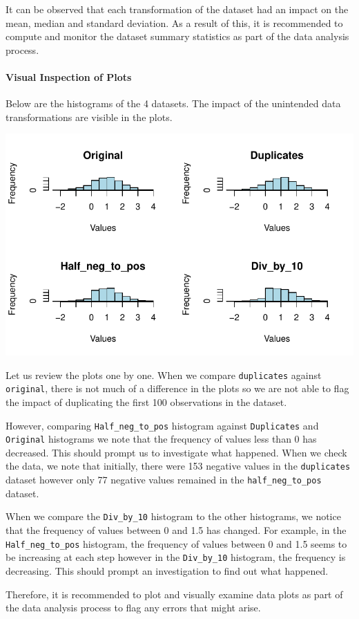 \documentclass[
  letterpaper,
  DIV=11,
  numbers=noendperiod]{scrartcl}
\let\oldparagraph\paragraph
\renewcommand{\paragraph}[1]{\oldparagraph{#1}\mbox{}}
\begin{document}
It can be observed that each transformation of the dataset had an impact
on the mean, median and standard deviation. As a result of this, it is
recommended to compute and monitor the dataset summary statistics as
part of the data analysis process.

\hypertarget{visual-inspection-of-plots}{%
\paragraph{Visual Inspection of
Plots}\label{visual-inspection-of-plots}}

Below are the histograms of the 4 datasets. The impact of the unintended
data transformations are visible in the plots.

\includegraphics{report_files/figure-pdf/unnamed-chunk-6-1.pdf}

Let us review the plots one by one. When we compare \texttt{duplicates}
against \texttt{original}, there is not much of a difference in the
plots so we are not able to flag the impact of duplicating the first 100
observations in the dataset.

However, comparing \texttt{Half\_neg\_to\_pos} histogram against
\texttt{Duplicates} and \texttt{Original} histograms we note that the
frequency of values less than 0 has decreased. This should prompt us to
investigate what happened. When we check the data, we note that
initially, there were 153 negative values in the \texttt{duplicates}
dataset however only 77 negative values remained in the
\texttt{half\_neg\_to\_pos} dataset.

When we compare the \texttt{Div\_by\_10} histogram to the other
histograms, we notice that the frequency of values between 0 and 1.5 has
changed. For example, in the \texttt{Half\_neg\_to\_pos} histogram, the
frequency of values between 0 and 1.5 seems to be increasing at each
step however in the \texttt{Div\_by\_10} histogram, the frequency is
decreasing. This should prompt an investigation to find out what
happened.

Therefore, it is recommended to plot and visually examine data plots as
part of the data analysis process to flag any errors that might arise.
\end{document}

